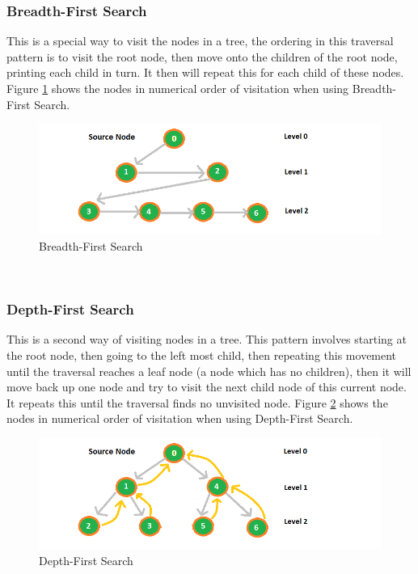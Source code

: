 \documentclass[10pt,twocolumn,hidelinks]{IEEEtran}
\begin{document}
\subsubsection{Breadth-First Search}
This is a special way to visit the nodes in a tree, the ordering in this traversal pattern is to visit the root node, then move onto the children of the root node, printing each child in turn. It then will repeat this for each child of these nodes. Figure \ref{fig:breadth} shows the nodes in numerical order of visitation when using Breadth-First Search. \\
\begin{figure}[h]
\includegraphics[scale=0.5]{bfs.png}
\caption{Breadth-First Search}
\label{fig:breadth}
\end{figure}
 \\
\subsubsection{Depth-First Search}
This is a second way of visiting nodes in a tree. This pattern involves starting at the root node, then going to the left most child, then repeating this movement until the traversal reaches a leaf node (a node which has no children), then it will move back up one node and try to visit the next child node of this current node. It repeats this until the traversal finds no unvisited node. Figure \ref{fig:depth} shows the nodes in numerical order of visitation when using Depth-First Search. 
\begin{figure}[h]
\includegraphics[scale=0.5]{dfs.png}
\caption{Depth-First Search}
\label{fig:depth}
\end{figure}
\end{document}

